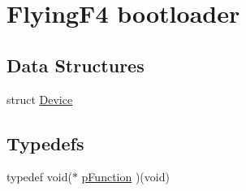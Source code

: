 \hypertarget{group___flying_f4_b_l}{\section{\-Flying\-F4 bootloader}
\label{group___flying_f4_b_l}
}
\subsection*{\-Data \-Structures}
\begin{DoxyCompactItemize}
\item 
struct \hyperlink{struct_device}{\-Device}
\end{DoxyCompactItemize}
\subsection*{\-Typedefs}
\begin{DoxyCompactItemize}
\item 
typedef void($\ast$ \hyperlink{group___flying_f4_b_l_ga9227bf1f1a9c633a0cc9ca50cc761c1a}{p\-Function} )(void)
\end{DoxyCompactItemize}
